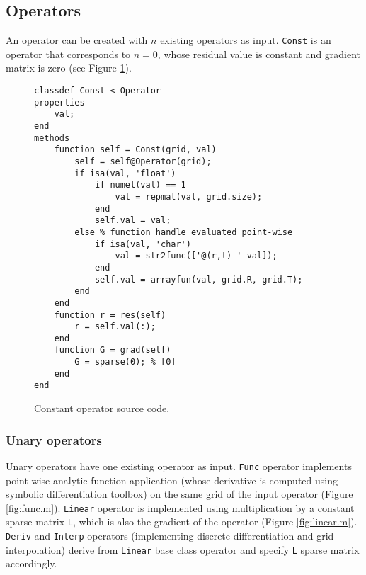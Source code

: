 \documentclass[MSc,beforeExam]{iitcsthesis}
\begin{document}
\subsection{Operators}
An operator can be created with $n$ existing operators as input.
\verb|Const| is an operator that corresponds to $n=0$, whose 
residual value is constant and gradient matrix is zero (see Figure \ref{fig:const.m}).

\begin{figure}[h]
\begin{lstlisting}
classdef Const < Operator
properties
    val;
end
methods
    function self = Const(grid, val)
        self = self@Operator(grid);
        if isa(val, 'float')
            if numel(val) == 1
                val = repmat(val, grid.size);
            end
            self.val = val;
        else % function handle evaluated point-wise
            if isa(val, 'char')
                val = str2func(['@(r,t) ' val]);
            end
            self.val = arrayfun(val, grid.R, grid.T);
        end
    end
    function r = res(self)
        r = self.val(:);
    end
    function G = grad(self)
        G = sparse(0); % [0]
    end
end
\end{lstlisting}
\caption{Constant operator source code.} \label{fig:const.m}
\end{figure}

\subsubsection{Unary operators}
Unary operators have one existing operator as input. 
\verb|Func| operator implements point-wise analytic function
application (whose derivative is computed using symbolic differentiation toolbox) on the same grid of the input operator (Figure \ref{fig:func.m}). 
\verb|Linear| operator is implemented
using multiplication by a constant sparse matrix 
\verb|L|, which is also the gradient of the operator
(Figure \ref{fig:linear.m}).
\verb|Deriv| and \verb|Interp| operators (implementing discrete
differentiation and grid interpolation) derive from \verb|Linear|
base class operator and specify \verb|L| sparse matrix accordingly.
\end{document}
